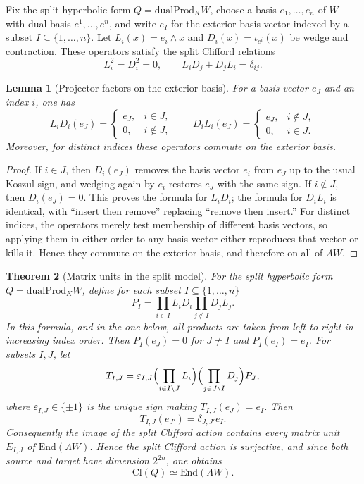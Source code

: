 \documentclass{birkjour}
\theoremstyle{plain}
\newtheorem{theorem}{Theorem}[section]
\newtheorem{lemma}[theorem]{Lemma}
\theoremstyle{definition}
\theoremstyle{remark}
\newcommand{\Cl}{\mathrm{Cl}}
\newcommand{\End}{\mathrm{End}}
\newcommand{\dualProd}{\mathrm{dualProd}}
\newcommand{\wedgeW}{\Lambda W}
\begin{document}
Fix the split hyperbolic form $Q=\dualProd_K W$, choose a basis
$e_1,\dots,e_n$ of $W$ with dual basis $e^1,\dots,e^n$, and write
$e_I$ for the exterior basis vector indexed by a subset
$I\subseteq \{1,\dots,n\}$. Let $L_i(x)=e_i\wedge x$ and
$D_i(x)=\iota_{e^i}(x)$ be wedge and contraction. These operators satisfy the
split Clifford relations
\[
  L_i^2=D_i^2=0,
  \qquad
  L_iD_j+D_jL_i=\delta_{ij}.
\]

\begin{lemma}[Projector factors on the exterior basis]
For a basis vector $e_J$ and an index $i$, one has
\[
  L_iD_i(e_J)=
  \begin{cases}
    e_J,& i\in J,\\
    0,& i\notin J,
  \end{cases}
  \qquad
  D_iL_i(e_J)=
  \begin{cases}
    e_J,& i\notin J,\\
    0,& i\in J.
  \end{cases}
\]
Moreover, for distinct indices these operators commute on the exterior basis.
\end{lemma}

\begin{proof}
If $i\in J$, then $D_i(e_J)$ removes the basis vector $e_i$ from $e_J$ up to
the usual Koszul sign, and wedging again by $e_i$ restores $e_J$ with the same
sign. If $i\notin J$, then $D_i(e_J)=0$. This proves the formula for $L_iD_i$;
the formula for $D_iL_i$ is identical, with ``insert then remove'' replacing
``remove then insert.'' For distinct indices, the operators merely test
membership of different basis vectors, so applying them in either order to any
basis vector either reproduces that vector or kills it. Hence they commute on
the exterior basis, and therefore on all of $\wedgeW$.
\end{proof}

\begin{theorem}[Matrix units in the split model]
\label{thm:matrix-units-split}
For the split hyperbolic form $Q=\dualProd_K W$, define for each subset
$I\subseteq \{1,\dots,n\}$
\[
  P_I=\prod_{i\in I} L_iD_i \prod_{j\notin I} D_jL_j .
\]
In this formula, and in the one below, all products are taken from left to
right in increasing index order. Then $P_I(e_J)=0$ for $J\neq I$ and
$P_I(e_I)=e_I$. For subsets $I,J$, let
\[
  T_{I,J}=
    \varepsilon_{I,J}
    \Bigl(\prod_{i\in I\setminus J} L_i\Bigr)
    \Bigl(\prod_{j\in J\setminus I} D_j\Bigr)
    P_J,
\]
where $\varepsilon_{I,J}\in\{\pm 1\}$ is the unique sign making
$T_{I,J}(e_J)=e_I$. Then
\[
  T_{I,J}(e_{J'})=\delta_{J,J'} e_I.
\]
Consequently the image of the split Clifford action contains every matrix unit
$E_{I,J}$ of $\End(\wedgeW)$. Hence the split Clifford action is
surjective, and since both source and target have dimension $2^{2n}$, one obtains
\[
  \Cl(Q)\simeq \End(\wedgeW).
\]
\end{theorem}
\end{document}

